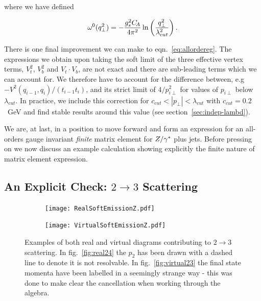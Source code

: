 		where we have defined

		\begin{align}
		  \label{eq:omega0}
		  \omega^0(q_{\perp}^2) = - \frac{g_s^2 C_{\!A}}{4\pi^2} \ln\left( \frac{q_\perp^2}{\lambda_{cut}^2}\right).
		\end{align}

		There is one final improvement we can make to eqn.~\eqref{eq:allordereg}.  The expressions
		we obtain upon taking the soft limit of the three effective vertex terms, $V^2_t$, $V^2_b$
		and $V_t\cdot V_b$, are not exact and there are sub-leading terms which we can account for.
		We therefore have to account for the difference between, e.g $-V^2(q_{i-1},q_{i})/(t_{i-1} t_i)$,
		and its strict limit of $4/p_{i\perp}^2$ for values of $p_{i\perp}$ below $\lambda_{cut}$.  In
		practice, we include this correction for $c_{cut}<|p_\perp|<\lambda_{cut}$ with
		$c_{cut} = 0.2$~GeV and find stable results around this value (see section~\ref{sec:indep-lambd}).

		We are, at last, in a position to move forward and form an expression for an all-orders
		gauge invariant \emph{finite} matrix element for $Z/\gamma^*$ plus jets.  Before pressing on
		we now discuss an example calculation showing explicitly the finite nature of
		matrix element expression.

	\subsection{An Explicit Check: $2\rightarrow3$ Scattering}

		\begin{figure}[bth]
			\centering
			\begin{subfigure}[b]{0.48\textwidth}
				\texttt{[image: RealSoftEmissionZ.pdf]}
				\caption{}
				\label{fig:real24}
			\end{subfigure}
			\begin{subfigure}[b]{0.48\textwidth}
				\centering
				\texttt{[image: VirtualSoftEmissionZ.pdf]}
				\caption{}
				\label{fig:virtual23}
			\end{subfigure}

			\caption{Examples of both real and virtual diagrams contributing to
			$2\rightarrow3$ scattering. In fig.~\eqref{fig:real24} the $p_2$ has been
			drawn with a dashed line to denote it is not resolvable.  In
			fig.~\eqref{fig:virtual23} the final state momenta have been labelled in a
			seemingly strange way - this was done to make clear the cancellation
			when working through the algebra.}
			\label{fig:2to}
		\end{figure}

